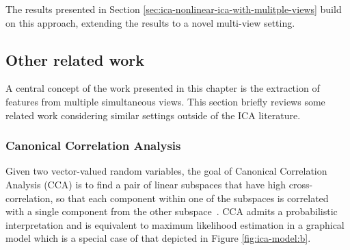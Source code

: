 The results presented in Section \ref{sec:ica-nonlinear-ica-with-mulitple-views} build on this approach, extending the results to a novel multi-view setting.


%


\subsection{Other related work}\label{sec:related-work}
A central concept of the work presented in this chapter is the extraction of features from multiple simultaneous views. 
This section briefly reviews some related work considering similar settings outside of the ICA literature.
\subsubsection{Canonical Correlation Analysis}
\label{sec:probacca}
Given two vector-valued random variables, the goal of Canonical Correlation Analysis (CCA) is to find a pair of linear subspaces that have high cross-correlation, so that each component within one of the subspaces is correlated with a single component from the other subspace~\citep{hotelling1992relations, bishop2006pattern}.
CCA admits a probabilistic interpretation \citep{bach2005probabilistic} and is equivalent to maximum likelihood estimation in a graphical model which is a special case of that depicted in Figure 
\ref{fig:ica-model:b}.

